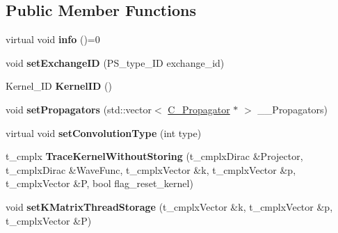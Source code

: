 \subsection*{Public Member Functions}
\begin{DoxyCompactItemize}
\item 
\hypertarget{class_c___abstract_kernel_a6a6510a5e44b78d22c6b1287121074c7}{virtual void {\bfseries info} ()=0}\label{class_c___abstract_kernel_a6a6510a5e44b78d22c6b1287121074c7}

\item 
\hypertarget{class_c___abstract_kernel_af2656096f4bb6b293b7c6fd6b98e1852}{void {\bfseries set\-Exchange\-I\-D} (P\-S\-\_\-type\-\_\-\-I\-D exchange\-\_\-id)}\label{class_c___abstract_kernel_af2656096f4bb6b293b7c6fd6b98e1852}

\item 
\hypertarget{class_c___abstract_kernel_a732c7cfecc0f30cd585734b4a3b2f5d0}{Kernel\-\_\-\-I\-D {\bfseries Kernel\-I\-D} ()}\label{class_c___abstract_kernel_a732c7cfecc0f30cd585734b4a3b2f5d0}

\item 
\hypertarget{class_c___abstract_kernel_a7f4d733129fb96fc6b3964c6b2ef696d}{void {\bfseries set\-Propagators} (std\-::vector$<$ \hyperlink{class_c___propagator}{C\-\_\-\-Propagator} $\ast$ $>$ \-\_\-\-\_\-\-Propagators)}\label{class_c___abstract_kernel_a7f4d733129fb96fc6b3964c6b2ef696d}

\item 
\hypertarget{class_c___abstract_kernel_a44d9413f79dcb3581f6f626dcaabda94}{virtual void {\bfseries set\-Convolution\-Type} (int type)}\label{class_c___abstract_kernel_a44d9413f79dcb3581f6f626dcaabda94}

\item 
\hypertarget{class_c___abstract_kernel_a0589cd3db4acff68cb08f7150bc3c994}{t\-\_\-cmplx {\bfseries Trace\-Kernel\-Without\-Storing} (t\-\_\-cmplx\-Dirac \&Projector, t\-\_\-cmplx\-Dirac \&Wave\-Func, t\-\_\-cmplx\-Vector \&k, t\-\_\-cmplx\-Vector \&p, t\-\_\-cmplx\-Vector \&P, bool flag\-\_\-reset\-\_\-kernel)}\label{class_c___abstract_kernel_a0589cd3db4acff68cb08f7150bc3c994}

\item 
\hypertarget{class_c___abstract_kernel_af7b68da40937efab335f2f3dc85a0aac}{void {\bfseries set\-K\-Matrix\-Thread\-Storage} (t\-\_\-cmplx\-Vector \&k, t\-\_\-cmplx\-Vector \&p, t\-\_\-cmplx\-Vector \&P)}\label{class_c___abstract_kernel_af7b68da40937efab335f2f3dc85a0aac}


\end{DoxyCompactItemize}
